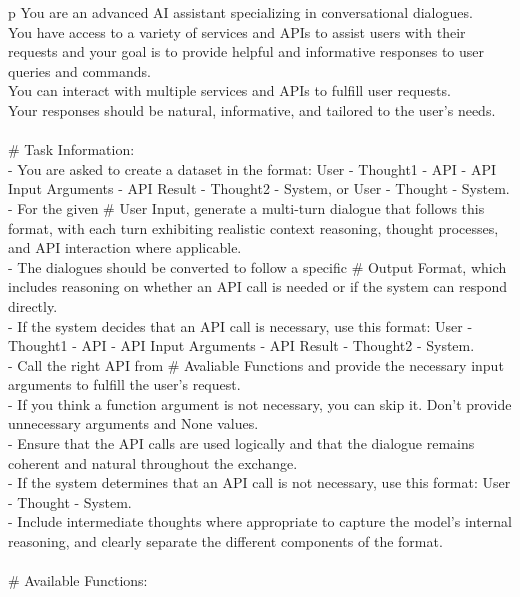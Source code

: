 \begin{table*}[!t]
\scriptsize
\centering
\ttfamily
\begin{tabular}{p\linewidth}
\toprule
You are an advanced AI assistant specializing in conversational dialogues. \\
You have access to a variety of services and APIs to assist users with their requests and your goal is to provide helpful and informative responses to user queries and commands. \\
You can interact with multiple services and APIs to fulfill user requests. \\
Your responses should be natural, informative, and tailored to the user's needs. \\
 \\
\# Task Information: \\
- You are asked to create a dataset in the format: User - Thought1 - API - API Input Arguments - API Result - Thought2 - System, or User - Thought - System.  \\
- For the given \# User Input, generate a multi-turn dialogue that follows this format, with each turn exhibiting realistic context reasoning, thought processes, and API interaction where applicable.  \\
- The dialogues should be converted to follow a specific \# Output Format, which includes reasoning on whether an API call is needed or if the system can respond directly. \\
- If the system decides that an API call is necessary, use this format: User - Thought1 - API - API Input Arguments - API Result - Thought2 - System. \\
- Call the right API from \# Avaliable Functions and provide the necessary input arguments to fulfill the user's request. \\
- If you think a function argument is not necessary, you can skip it. Don't provide unnecessary arguments and None values. \\
- Ensure that the API calls are used logically and that the dialogue remains coherent and natural throughout the exchange.  \\
- If the system determines that an API call is not necessary, use this format: User - Thought - System. \\
- Include intermediate thoughts where appropriate to capture the model's internal reasoning, and clearly separate the different components of the format. \\
\\
\# Available Functions: \\

\end{tabular}
\end{table*}
